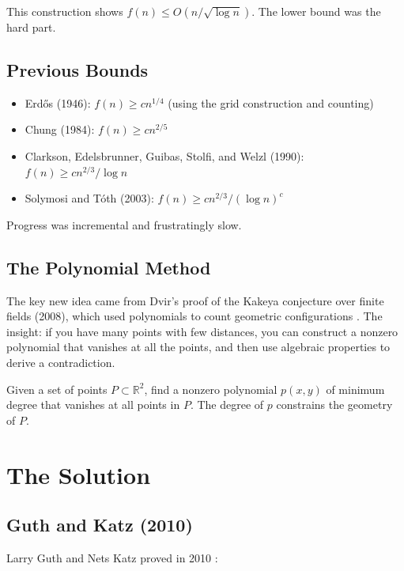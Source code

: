 This construction shows $f(n) \leq O(n/\sqrt{\log n})$. The lower bound was the hard part.

\subsection{Previous Bounds}

\begin{itemize}
\item Erd\H{o}s (1946): $f(n) \geq cn^{1/4}$ (using the grid construction and counting) \cite{erdos1946}
\item Chung (1984): $f(n) \geq cn^{2/5}$ \cite{chung1984}
\item Clarkson, Edelsbrunner, Guibas, Stolfi, and Welzl (1990): $f(n) \geq cn^{2/3}/\log n$ \cite{clarkson1990}
\item Solymosi and T\'oth (2003): $f(n) \geq cn^{2/3}/(\log n)^{c}$ \cite{solymosi2003}
\end{itemize}

Progress was incremental and frustratingly slow.

\subsection{The Polynomial Method}

The key new idea came from Dvir's proof of the Kakeya conjecture over finite fields (2008), which used polynomials to count geometric configurations \cite{dvir2009}. The insight: if you have many points with few distances, you can construct a nonzero polynomial that vanishes at all the points, and then use algebraic properties to derive a contradiction.

\begin{definition}
Given a set of points $P \subset \mathbb{R}^2$, find a nonzero polynomial $p(x,y)$ of minimum degree that vanishes at all points in $P$. The degree of $p$ constrains the geometry of $P$.
\end{definition}

\section{The Solution}

\subsection{Guth and Katz (2010)}

Larry Guth and Nets Katz proved in 2010 \cite{guth2015}:

